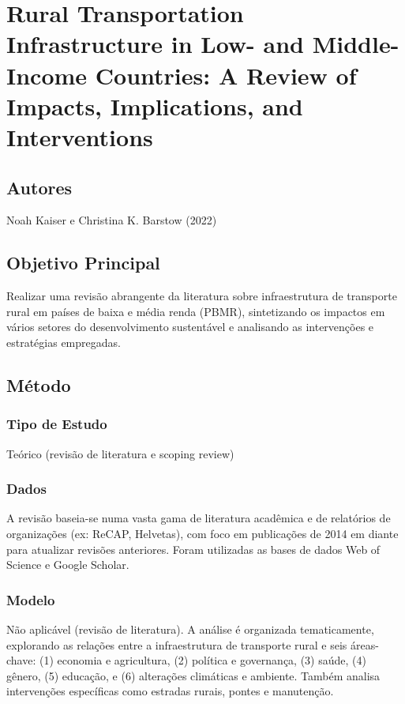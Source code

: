 \documentclass[12pt]{article}
\begin{document}
\section{Rural Transportation Infrastructure in Low- and Middle-Income Countries: A Review of Impacts, Implications, and Interventions}

\subsection*{Autores}
Noah Kaiser e Christina K. Barstow (2022)

\subsection*{Objetivo Principal}
Realizar uma revisão abrangente da literatura sobre infraestrutura de transporte rural em países de baixa e média renda (PBMR), sintetizando os impactos em vários setores do desenvolvimento sustentável e analisando as intervenções e estratégias empregadas.

\subsection*{Método}

\subsubsection*{Tipo de Estudo}
Teórico (revisão de literatura e scoping review)

\subsubsection*{Dados}
A revisão baseia-se numa vasta gama de literatura acadêmica e de relatórios de organizações (ex: ReCAP, Helvetas), com foco em publicações de 2014 em diante para atualizar revisões anteriores. Foram utilizadas as bases de dados Web of Science e Google Scholar.

\subsubsection*{Modelo}
Não aplicável (revisão de literatura). A análise é organizada tematicamente, explorando as relações entre a infraestrutura de transporte rural e seis áreas-chave: (1) economia e agricultura, (2) política e governança, (3) saúde, (4) gênero, (5) educação, e (6) alterações climáticas e ambiente. Também analisa intervenções específicas como estradas rurais, pontes e manutenção.
\end{document}
